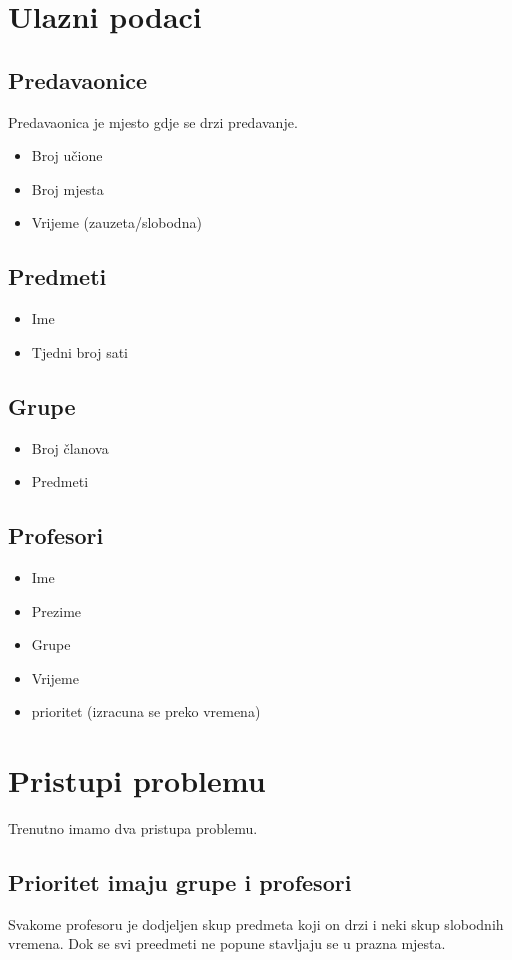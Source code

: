 \section{Ulazni podaci}
  \subsection{Predavaonice}
  Predavaonica je mjesto gdje se drzi predavanje.
    \begin{itemize}
      \item Broj učione
      \item Broj mjesta
      \item Vrijeme (zauzeta/slobodna)
    \end{itemize}
  \subsection{Predmeti}
    \begin{itemize}
      \item Ime
      \item Tjedni broj sati
    \end{itemize}
  \subsection{Grupe}
    \begin{itemize}
      \item Broj članova
      \item Predmeti
    \end{itemize}
  \subsection{Profesori}
    \begin{itemize}
      \item Ime
      \item Prezime
      \item Grupe
      \item Vrijeme
      \item prioritet (izracuna se preko vremena)
    \end{itemize}
\section{Pristupi problemu}
    Trenutno imamo dva pristupa problemu.
    \subsection{Prioritet imaju grupe i profesori}
    Svakome profesoru je dodjeljen skup predmeta koji on drzi i neki skup slobodnih vremena. Dok se svi preedmeti ne popune stavljaju se u prazna mjesta.
